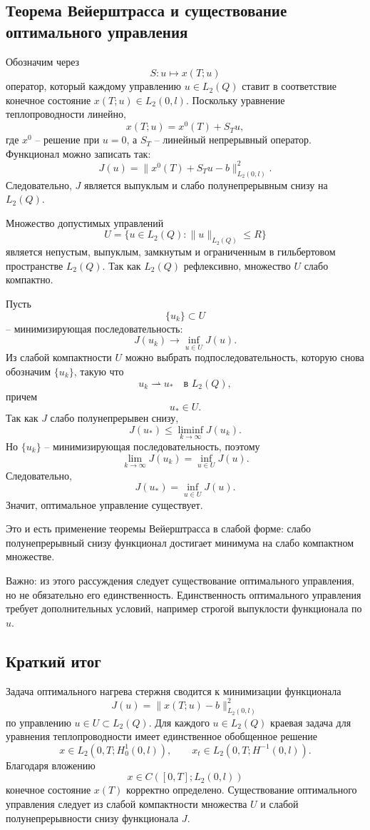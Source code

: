 \documentclass[12pt,a4paper]{article}
\newcommand{\qpart}[2]{\par\bigskip\noindent{\Large\bfseries #1. #2}\par\nobreak\medskip}
\begin{document}
\subsection*{Теорема Вейерштрасса и существование оптимального управления}
Обозначим через
\[
S:u\mapsto x(T;u)
\]
оператор, который каждому управлению \(u\in L_2(Q)\) ставит в соответствие конечное состояние \(x(T;u)\in L_2(0,l)\). Поскольку уравнение теплопроводности линейно,
\[
x(T;u)=x^0(T)+S_Tu,
\]
где \(x^0\) -- решение при \(u=0\), а \(S_T\) -- линейный непрерывный оператор. Функционал можно записать так:
\[
J(u)=\|x^0(T)+S_Tu-b\|_{L_2(0,l)}^2.
\]
Следовательно, \(J\) является выпуклым и слабо полунепрерывным снизу на \(L_2(Q)\).

\qpart{3}{Теорема Вейерштрасса}

Множество допустимых управлений
\[
U=\{u\in L_2(Q):\|u\|_{L_2(Q)}\le R\}
\]
является непустым, выпуклым, замкнутым и ограниченным в гильбертовом пространстве \(L_2(Q)\). Так как \(L_2(Q)\) рефлексивно, множество \(U\) слабо компактно.

Пусть
\[
\{u_k\}\subset U
\]
-- минимизирующая последовательность:
\[
J(u_k)\to \inf_{u\in U}J(u).
\]
Из слабой компактности \(U\) можно выбрать подпоследовательность, которую снова обозначим \(\{u_k\}\), такую что
\[
u_k\rightharpoonup u_*
\quad \text{в }L_2(Q),
\]
причем
\[
u_*\in U.
\]
Так как \(J\) слабо полунепрерывен снизу,
\[
J(u_*)\le \liminf_{k\to\infty}J(u_k).
\]
Но \(\{u_k\}\) -- минимизирующая последовательность, поэтому
\[
\lim_{k\to\infty}J(u_k)=\inf_{u\in U}J(u).
\]
Следовательно,
\[
J(u_*)=\inf_{u\in U}J(u).
\]
Значит, оптимальное управление существует.

Это и есть применение теоремы Вейерштрасса в слабой форме: слабо полунепрерывный снизу функционал достигает минимума на слабо компактном множестве.

Важно: из этого рассуждения следует существование оптимального управления, но не обязательно его единственность. Единственность оптимального управления требует дополнительных условий, например строгой выпуклости функционала по \(u\).

\subsection*{Краткий итог}
Задача оптимального нагрева стержня сводится к минимизации функционала
\[
J(u)=\|x(T;u)-b\|_{L_2(0,l)}^2
\]
по управлению \(u\in U\subset L_2(Q)\). Для каждого \(u\in L_2(Q)\) краевая задача для уравнения теплопроводности имеет единственное обобщенное решение
\[
x\in L_2(0,T;H_0^1(0,l)),
\qquad
x_t\in L_2(0,T;H^{-1}(0,l)).
\]
Благодаря вложению
\[
x\in C([0,T];L_2(0,l))
\]
конечное состояние \(x(T)\) корректно определено. Существование оптимального управления следует из слабой компактности множества \(U\) и слабой полунепрерывности снизу функционала \(J\).
\end{document}
